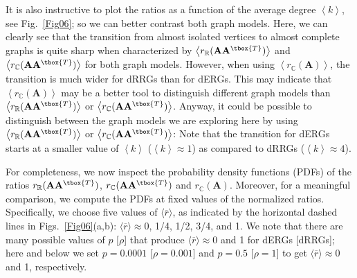 It is also instructive to plot the ratios as a function of the average degree
$\left\langle k \right\rangle$, see Fig.~\ref{Fig06}; so we can better contrast both graph models.
Here, we can clearly see that the transition from almost isolated vertices to almost complete
graphs is quite sharp when characterized by
$\left\langle r_\mathbb{R}(\mathbf{A}\mathbf{A}^{\tbox{T}}) \right\rangle$ and 
$\left\langle r_\mathbb{C}(\mathbf{A}\mathbf{A}^{\tbox{T}}) \right\rangle$ for both graph models.
However, when using $\left\langle r_\mathbb{C}(\mathbf{A}) \right\rangle$, the transition is 
much wider for dRRGs than for dERGs.
This may indicate that $\left\langle r_\mathbb{C}(\mathbf{A}) \right\rangle$ may be a better
tool to distinguish different graph models than 
$\left\langle r_\mathbb{R}(\mathbf{A}\mathbf{A}^{\tbox{T}}) \right\rangle$ or 
$\left\langle r_\mathbb{C}(\mathbf{A}\mathbf{A}^{\tbox{T}}) \right\rangle$.
Anyway, it could be possible to distinguish between the graph models we are exploring here
by using $\left\langle r_\mathbb{R}(\mathbf{A}\mathbf{A}^{\tbox{T}}) \right\rangle$ or 
$\left\langle r_\mathbb{C}(\mathbf{A}\mathbf{A}^{\tbox{T}}) \right\rangle$: Note that the
transition for dERGs starts at a smaller value of $\left\langle k \right\rangle$ 
($\left\langle k \right\rangle\approx 1$) as compared to dRRGs ($\left\langle k \right\rangle\approx 4$).


For completeness, we now inspect the probability density functions (PDFs) of the ratios 
$r_\mathbb{R}(\mathbf{A}\mathbf{A}^{\tbox{T}})$, 
$r_\mathbb{C}(\mathbf{A}\mathbf{A}^{\tbox{T}})$ and
$r_\mathbb{C}(\mathbf{A})$.
Moreover, for a meaningful comparison, we compute the PDFs at fixed 
values of the normalized ratios. Specifically, we choose five values of $\langle \overline{r}\rangle$, 
as indicated by the horizontal dashed lines in Figs.~\ref{Fig06}(a,b):
$\langle \overline{r}\rangle\approx 0$, 1/4, 1/2, 3/4, and 1.
We note that there are many possible values of $p$ [$\rho$] that produce 
$\langle \overline{r}\rangle\approx 0$ and 1 for dERGs [dRRGs]; here and below we set 
 $p=0.0001$ [$\rho=0.001$] and $p=0.5$ [$\rho=1$] to get 
$\langle \overline{r}\rangle\approx 0$ and 1, respectively.

